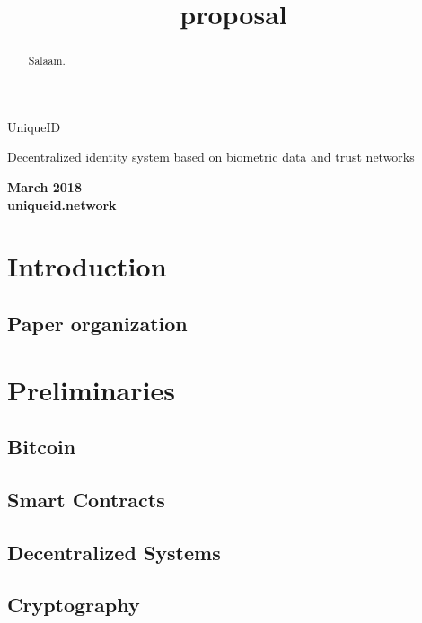 \documentclass{article}
\title{proposal}
\begin{document}
\begin{titlepage}
\begin{center}
\begin{Huge}
UniqueID
\end{Huge}

\vspace{45mm}

\begin{huge}
Decentralized identity system based on biometric data and trust networks
\end{huge}


\vspace{85mm}

\textbf{ March 2018}
\\
\textbf{ uniqueid.network}
\end{center}
\end{titlepage}

\newpage

\begin{abstract}
Salaam.
\end{abstract}

\section{Introduction}

\subsection{Paper organization}



\section{Preliminaries}
\subsection{Bitcoin}
\subsection{Smart Contracts}
\subsection{Decentralized Systems}
\subsection{ Cryptography}
\end{document}
